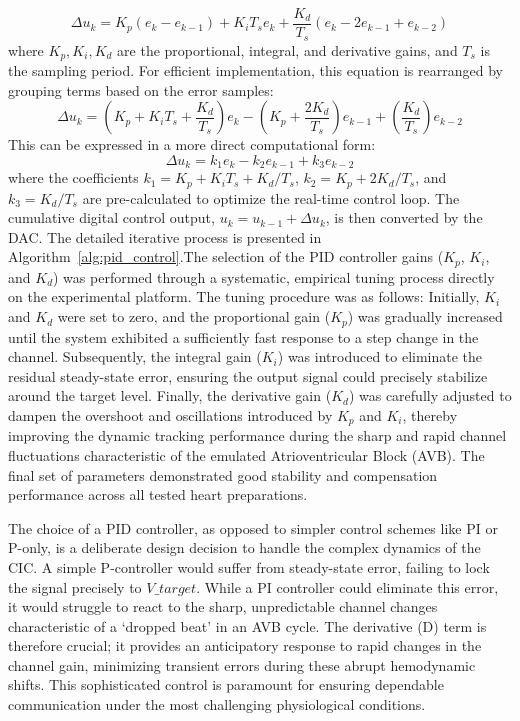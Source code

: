 \documentclass[journal]{IEEEtran}
\begin{document}
\begin{equation}
    \Delta u_k = K_p (e_k - e_{k-1}) + K_i T_s e_k + \frac{K_d}{T_s} (e_k - 2e_{k-1} + e_{k-2})
    \label{eq:PID_standard_discrete}
\end{equation}
where $K_p, K_i, K_d$ are the proportional, integral, and derivative gains, and $T_s$ is the sampling period. For efficient implementation, this equation is rearranged by grouping terms based on the error samples:
\begin{equation}
    \Delta u_k = (K_p + K_i T_s + \frac{K_d}{T_s}) e_k - (K_p + \frac{2K_d}{T_s}) e_{k-1} + (\frac{K_d}{T_s}) e_{k-2}
    \label{eq:PID_rearranged}
\end{equation}
This can be expressed in a more direct computational form:
\begin{equation}
    \Delta u_k = k_1 e_k - k_2 e_{k-1} + k_3 e_{k-2}
    \label{eq:PID_computational_form}
\end{equation}
where the coefficients $k_1 = K_p + K_i T_s + K_d/T_s$, $k_2 = K_p + 2K_d/T_s$, and $k_3 = K_d/T_s$ are pre-calculated to optimize the real-time control loop. The cumulative digital control output, $u_k = u_{k-1} + \Delta u_k$, is then converted by the DAC. The detailed iterative process is presented in Algorithm~\ref{alg:pid_control}.The selection of the PID controller gains ($K_p$, $K_i$, and $K_d$) was performed through a systematic, empirical tuning process directly on the experimental platform. The tuning procedure was as follows: Initially, $K_i$ and $K_d$ were set to zero, and the proportional gain ($K_p$) was gradually increased until the system exhibited a sufficiently fast response to a step change in the channel. Subsequently, the integral gain ($K_i$) was introduced to eliminate the residual steady-state error, ensuring the output signal could precisely stabilize around the target level. Finally, the derivative gain ($K_d$) was carefully adjusted to dampen the overshoot and oscillations introduced by $K_p$ and $K_i$, thereby improving the dynamic tracking performance during the sharp and rapid channel fluctuations characteristic of the emulated Atrioventricular Block (AVB). The final set of parameters demonstrated good stability and compensation performance across all tested heart preparations.


The choice of a PID controller, as opposed to simpler control schemes like PI or P-only, is a deliberate design decision to handle the complex dynamics of the CIC. A simple P-controller would suffer from steady-state error, failing to lock the signal precisely to $V\_target$. While a PI controller could eliminate this error, it would struggle to react to the sharp, unpredictable channel changes characteristic of a `dropped beat' in an AVB cycle. The derivative (D) term is therefore crucial; it provides an anticipatory response to rapid changes in the channel gain, minimizing transient errors during these abrupt hemodynamic shifts. This sophisticated control is paramount for ensuring dependable communication under the most challenging physiological conditions.
\end{document}
